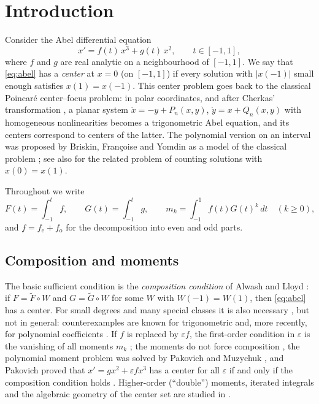 \documentclass[11pt]{amsart}
\numberwithin{equation}{section}
\theoremstyle{plain}
\theoremstyle{definition}
\theoremstyle{remark}
\newcommand{\fe}{f_{\mathrm e}}
\newcommand{\fo}{f_{\mathrm o}}
\begin{document}
\maketitle

\section{Introduction}

Consider the Abel differential equation
\begin{equation}\label{eq:abel}
 x'=f(t)\,x^3+g(t)\,x^2,\qquad t\in[-1,1],
\end{equation}
where $f$ and $g$ are real analytic on a neighbourhood of $[-1,1]$. We say that
\eqref{eq:abel} has a \emph{center} at $x=0$ (on $[-1,1]$) if every solution with
$|x(-1)|$ small enough satisfies $x(1)=x(-1)$. This center problem goes back to
the classical Poincar\'e center--focus problem: in polar coordinates, and after
Cherkas' transformation \cite{Che76}, a planar system
$\dot x=-y+P_n(x,y)$, $\dot y=x+Q_n(x,y)$ with homogeneous nonlinearities becomes
a trigonometric Abel equation, and its centers correspond to centers of the
latter. The polynomial version on an interval was proposed by Briskin,
Fran\c{c}oise and Yomdin as a model of the classical problem
\cite{BFY99,BFY00a,BFY00b}; see also \cite{LN80} for the related problem of
counting solutions with $x(0)=x(1)$.

Throughout we write
\[
 F(t)=\int_{-1}^tf,\qquad G(t)=\int_{-1}^tg,\qquad
 m_k=\int_{-1}^1f(t)G(t)^k\,dt\quad(k\ge0),
\]
and $f=\fe+\fo$ for the decomposition into even and odd parts.

\subsection*{Composition and moments}
The basic sufficient condition is the \emph{composition condition} of Alwash and
Lloyd \cite{AL87}: if $F=\tilde F\circ W$ and $G=\tilde G\circ W$ for some
$W$ with $W(-1)=W(1)$, then \eqref{eq:abel} has a center. For small degrees and
many special classes it is also necessary
\cite{BFY99,BFY00a,BFY00b,Chr00,Alw09,GGL13}, but not in general: counterexamples
are known for trigonometric \cite{Alw09,GGS14} and, more recently, for polynomial
coefficients \cite{GGS19}. If $f$ is replaced by $\varepsilon f$, the first-order
condition in $\varepsilon$ is the vanishing of all moments $m_k$ \cite{BFY00a};
the moments do not force composition \cite{Pak02}, the polynomial moment problem
was solved by Pakovich and Muzychuk \cite{PM09}, and Pakovich proved that
$x'=gx^2+\varepsilon fx^3$ has a center for all $\varepsilon$ if and only if the
composition condition holds \cite{Pak17}. Higher-order (``double'') moments,
iterated integrals and the algebraic geometry of the center set are studied in
\cite{Bru06,BRY10,CGM13a,CGM13b,BPY16,Gav20,ABCM21}.
\end{document}
